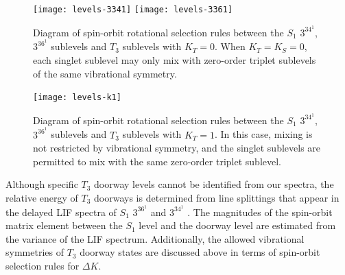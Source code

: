 \documentclass[12pt]{mitthesis}
\begin{document}


\begin{figure}
  \caption{Diagram of spin-orbit rotational selection rules between
    the $S_1$ $3^34^1$, $3^36^1$  sublevels and $T_3$ sublevels
    with $K_T=0$.  When $K_T=K_S=0$, each singlet sublevel may only
    mix with zero-order triplet sublevels of the same vibrational
    symmetry.}
  \label{fig:levels-k0}
  \centering
  \vspace{5mm}
  \texttt{[image: levels-3341]}
  \texttt{[image: levels-3361]}  
\end{figure}

\begin{figure}
  \caption{Diagram of spin-orbit rotational selection rules between
    the $S_1$ $3^34^1$, $3^36^1$  sublevels and $T_3$ sublevels
    with $K_T=1$.  In this case, mixing is not restricted by
    vibrational symmetry, and the singlet sublevels are permitted to
    mix with the same zero-order triplet sublevel.}
  \label{fig:levels-k1}
  \centering
  \vspace{5mm}
  \texttt{[image: levels-k1]}
\end{figure}


Although specific $T_3$ doorway levels cannot be identified from our
spectra, the relative energy of $T_3$ doorways is determined from line
splittings that appear in the delayed LIF spectra of $S_1$ $3^36^1$
 and $3^34^1$ .  The magnitudes of the spin-orbit matrix
element between the $S_1$ level and the doorway level are estimated
from the variance of the LIF spectrum.  Additionally, the allowed
vibrational symmetries of $T_3$ doorway states are discussed above in
terms of spin-orbit selection rules for $\Delta K$.





















\end{document}
